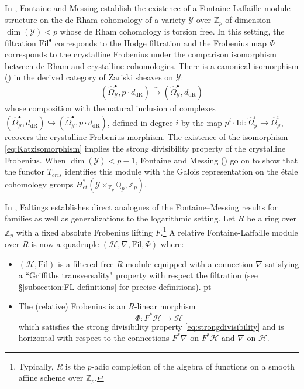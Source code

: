 \documentclass[reqno]{amsart}
\numberwithin{equation}{section}
\numberwithin{equation}{section}
\numberwithin{equation}{section}
\theoremstyle{definition}
\theoremstyle{remark}
\theoremstyle{remark}
\newcommand{\calH}{\mathcal{H}}
\begin{document}
In \cite[II.2.7]{FontaineMessing}, Fontaine and Messing establish the existence of a Fontaine-Laffaille module structure on the de Rham cohomology of a variety $\mathcal{Y}$ over $\mathbb{Z}_p$ of dimension $\operatorname{dim}(\mathcal{Y})< p$ whose de Rham cohomology is torsion free. In this setting, the filtration $\mathrm{Fil}^\bullet$ corresponds to the Hodge filtration and the Frobenius map $\Phi$ corresponds to the crystalline Frobenius under the comparison isomorphism between de Rham and crystalline cohomologies. There is a canonical isomorphism (\cite{deligneillusie,Kato}) in the derived category of Zariski sheaves on $\mathcal{Y}$:
\begin{align} \label{eq:Katzisomorphism}
(\hat{\Omega}^\bullet_{\mathcal{Y}}, p \cdot d_{\mathrm{dR}}) \xrightarrow{\sim} (\hat{\Omega}^\bullet_{\mathcal{Y}}, d_{\mathrm{dR}})
\end{align}
whose composition with the natural inclusion of complexes $(\hat{\Omega}^\bullet_{\mathcal{Y}}, d_{\mathrm{dR}}) \hookrightarrow (\hat{\Omega}^\bullet_{\mathcal{Y}}, p \cdot d_{\mathrm{dR}})$, defined in degree $i$ by the map $p^i \cdot \mathrm{Id}: \hat{\Omega}^i_{\mathcal{Y}} \to \hat{\Omega}^i_{\mathcal{Y}}$, recovers the crystalline Frobenius morphism. The existence of the isomorphism \eqref{eq:Katzisomorphism} implies the strong divisibility property of the crystalline Frobenius. When $\operatorname{dim}(\mathcal{Y})< p-1$, Fontaine and Messing (\cite[III.6.4]{FontaineMessing}) go on to show that the functor $T_{cris}$ identifies this module with the Galois representation on the \'etale cohomology groups $H_{et}^*(\mathcal{Y} \times_{\mathbb{Z}_p}\bar{\mathbb{Q}}_p,\mathbb{Z}_p)$.


In \cite{Faltings1989}, Faltings establishes direct analogues of the Fontaine--Messing results for families as well as generalizations to the logarithmic setting. Let $R$ be a ring over $\mathbb{Z}_p$ with a fixed absolute Frobenius lifting \( F \).\footnote{Typically, $R$ is the $p$-adic completion of the algebra of functions on a smooth affine scheme over $\mathbb{Z}_p$.} A relative Fontaine-Laffaille module over $R$ is now a quadruple $(\calH, \nabla, \mathrm{Fil}, \Phi)$ where: \begin{itemize} \item \( (\calH, \mathrm{Fil}) \) is a filtered free $R$-module equipped with a connection \( \nabla \) satisfying a ``Griffiths transversality" property with respect the filtration (see \S \ref{subsection:FL definitions} for precise definitions).  pt 
     \item The (relative) Frobenius is an $R$-linear morphism 
    \[
    \Phi : F^{*} \calH \longrightarrow \calH \] which satisfies the strong divisibility property \eqref{eq:strongdivisibility} and is horizontal with respect to the
    connections \( F^{*}\nabla \) on \( F^{*} \calH \) and \( \nabla \) on \( \calH \). \end{itemize} 
 
\end{document}
